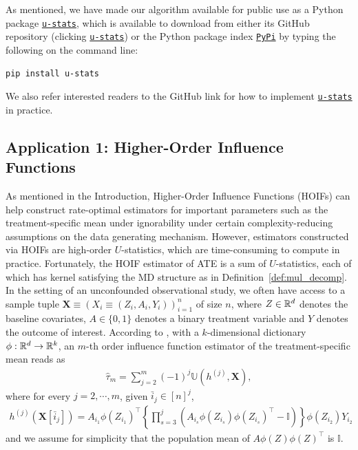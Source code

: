 \documentclass[letterpaper,11pt]{article}
\newcommand{\libref}[2]{\href{#2}{\texttt{#1}}}
\newcommand{\ustat}{\mathbb{U}}
\def\package{\libref{u-stats}{https://github.com/zrq1706/U-Statistics-Python}}
\begin{document}
\begin{bibunit}[plainnat]
As mentioned, we have made our algorithm available for public use as a Python package \package{}, which is available to download from either its GitHub repository (clicking \package{}) or the Python package index \href{https://pypi.org/}{\texttt{PyPi}} by typing the following on the command line:\begin{lstlisting}[language=bash]
pip install u-stats
\end{lstlisting}
\noindent We also refer interested readers to the GitHub link for how to implement \package{} in practice.


\subsection{Application 1: Higher-Order Influence Functions}  
\label{sec:example_hoif}

As mentioned in the Introduction, Higher-Order Influence Functions (HOIFs) \citep{robins2008higher} can help construct rate-optimal estimators for important parameters such as the treatment-specific mean under ignorability under certain complexity-reducing assumptions on the data generating mechanism. However, estimators constructed via HOIFs are high-order $U$-statistics, which are time-consuming to compute in practice. Fortunately, the HOIF estimator of ATE is a sum of $U$-statistics, each of which has kernel satisfying the MD structure as in Definition~\ref{def:mul_decomp}. 
In the setting of an unconfounded observational study, we often have access to a sample tuple $\bm{X} \equiv (X_{i} \equiv (Z_{i}, A_{i}, Y_{i}))_{i = 1}^{n}$ of size $n$, where $Z \in {\mathbb{R}}^{d}$ denotes the baseline covariates, $A \in \{0, 1\}$ denotes a binary treatment variable and $Y$ denotes the outcome of interest. According to \citet{robins2008higher}, with a $k$-dimensional dictionary $\phi: {\mathbb{R}}^{d} \rightarrow {\mathbb{R}}^{k}$, an $m$-th order influence function estimator of the treatment-specific mean reads as
\begin{align*}
 \hat{\tau}_{m} = \sum_{j = 2}^{m} (-1)^{j} \ustat (h^{(j)}, \bm{X}), 
\end{align*}
where for every $j = 2, \cdots, m$, given $\bar{i}_{j} \in [n]^j$,
\begin{align*}
 h^{(j)} (\bm{X}[\bar{i}_{j}]) = A_{i_{1}} \phi (Z_{i_{1}})^{\top} \left\{ \prod_{s = 3}^{j} \left( A_{i_{s}} \phi (Z_{i_{s}}) \phi (Z_{i_{s}})^{\top} - \mathbb{I} \right) \right\} \phi (Z_{i_{2}}) Y_{i_{2}}
\end{align*}
and we assume for simplicity that the population mean of $A \phi (Z) \phi (Z)^{\top}$ is $\mathbb{I}$.


\end{bibunit}
\end{document}
